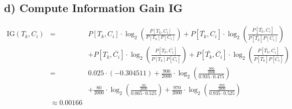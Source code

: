 \documentclass[a4paper]{article}
\begin{document}
\subsection*{d) Compute Information Gain IG}
\begin{align*} 
\text{IG}(T_k,C_i) &= &P[T_k,C_i] \cdot \log_2 \left( \frac{P[T_k,C_i]}{P[T_k] P[C_i]}\right) + P[\bar{T_k},C_i] \cdot \log_2 \left( \frac{P[\bar{T_k},C_i]}{P[\bar{T_k}] P[C_i]}\right) \\
&&+ P[T_k,\bar{C_i}] \cdot \log_2 \left( \frac{P[T_k,\bar{C_i}]}{P[T_k] P[\bar{C_i}]}\right) + P[\bar{T_k},\bar{C_i}] \cdot \log_2 \left( \frac{P[\bar{T_k},\bar{C_i}]}{P[\bar{T_k}] P[\bar{C_i}]}\right) \\
&= &0.025 \cdot (-0.304511) + \frac{900}{2000} \cdot \log_2 \left( \frac{\frac{900}{2000}}{0.935 \cdot 0.475}\right) \\
&&+ \frac{80}{2000} \cdot \log_2 \left( \frac{\frac{80}{2000}}{0.065 \cdot 0.525}\right) + \frac{970}{2000} \cdot \log_2 \left( \frac{\frac{970}{2000}}{0.935 \cdot 0.525}\right) \\
&\approx 0.00166
\end{align*}
\end{document}
